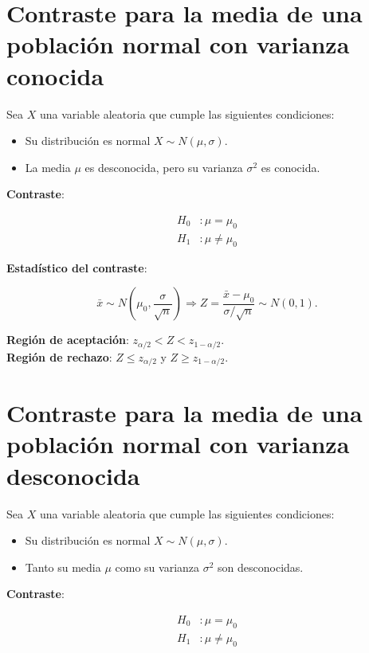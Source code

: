 \documentclass[
  spanish,
  a4paper,
]{scrreport}
\providecommand{\tightlist}{%
  \setlength{\itemsep}{0pt}\setlength{\parskip}{0pt}}
\theoremstyle{plain}
\theoremstyle{definition}
\theoremstyle{definition}
\theoremstyle{remark}
\begin{document}
\section{Contraste para la media de una población normal con varianza
conocida}\label{contraste-para-la-media-de-una-poblaciuxf3n-normal-con-varianza-conocida}

Sea \(X\) una variable aleatoria que cumple las siguientes condiciones:

\begin{itemize}
\tightlist
\item
  Su distribución es normal \(X\sim N(\mu,\sigma)\).
\item
  La media \(\mu\) es desconocida, pero su varianza \(\sigma^2\) es
  conocida.
\end{itemize}

\textbf{Contraste}:

\begin{align*}
H_0 &: \mu=\mu_0 \\
H_1 &: \mu\neq \mu_0\end{align*}

\textbf{Estadístico del contraste}:

\[
\bar x\sim N\left(\mu_0,\frac{\sigma}{\sqrt{n}}\right) \Rightarrow Z=\frac{\bar x-\mu_0}{\sigma/\sqrt{n}}\sim N(0,1).
\]

\textbf{Región de aceptación}: \(z_{\alpha/2}< Z < z_{1-\alpha/2}\).\\
\textbf{Región de rechazo}: \(Z\leq z_{\alpha/2}\) y
\(Z\geq z_{1-\alpha/2}\).

\section{Contraste para la media de una población normal con varianza
desconocida}\label{contraste-para-la-media-de-una-poblaciuxf3n-normal-con-varianza-desconocida}

Sea \(X\) una variable aleatoria que cumple las siguientes condiciones:

\begin{itemize}
\tightlist
\item
  Su distribución es normal \(X\sim N(\mu,\sigma)\).
\item
  Tanto su media \(\mu\) como su varianza \(\sigma^2\) son desconocidas.
\end{itemize}

\textbf{Contraste}:

\begin{align*}
H_0 &: \mu=\mu_0 \\
H_1 &: \mu\neq \mu_0\end{align*}
\end{document}

